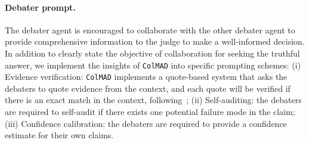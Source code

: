 \documentclass{article} %
\newcommand{\ours}[0]{\texttt{ColMAD}\xspace}
\begin{document}
\paragraph{Debater prompt.}  The debater agent is encouraged to collaborate with the other debater agent to provide comprehensive information to the judge to make a well-informed decision. In addition to clearly state the objective of collaboration for seeking the truthful answer, we implement the insights of \ours into specific prompting schemes: (i) Evidence verification: \ours implements a quote-based system that asks the debaters to quote evidence from the context, and each quote will be verified if there is an exact match in the context, following~\citet{kenton2024on}; (ii) Self-auditing: the debaters are required to self-audit if there exists one potential failure mode in the claim; (iii) Confidence calibration: the debaters are required to provide a confidence estimate for their own claims.
\end{document}
